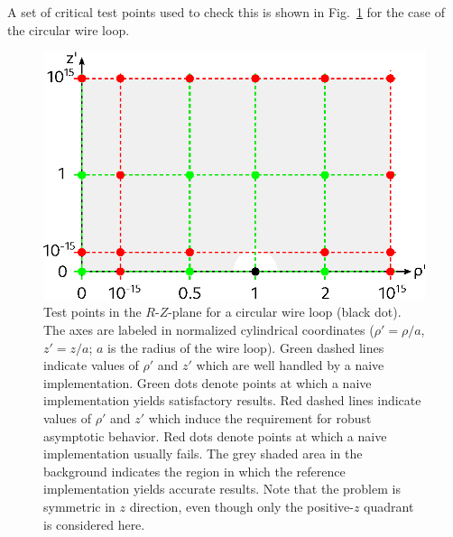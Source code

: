 A set of critical test points used to check this is shown in Fig.~\ref{fig:circularLoop_criticalPoints}
for the case of the circular wire loop.
\begin{figure}[htbp]
 \centering
 \includegraphics{img/circularLoop_criticalPoints.eps}
 \caption{Test points in the $R$-$Z$-plane for a circular wire loop (black dot).
          The axes are labeled in normalized cylindrical coordinates ($\rho' = \rho / a$, $z' = z / a$; $a$ is the radius of the wire loop).
          Green dashed lines indicate values of $\rho'$ and $z'$ which are well handled by a naive implementation.
          Green dots denote points at which a naive implementation yields satisfactory results.
          Red dashed lines indicate values of $\rho'$ and $z'$ which induce the requirement for robust asymptotic behavior.
          Red dots denote points at which a naive implementation usually fails.
          The grey shaded area in the background indicates the region in which the reference implementation yields accurate results.
          Note that the problem is symmetric in $z$ direction, even though only the positive-$z$ quadrant is considered here.}
 \label{fig:circularLoop_criticalPoints}
\end{figure}

